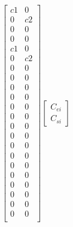 \documentclass[11pt]{article} %
\begin{document}
\begin{align}
\begin{bmatrix}
        c1 & 0\\
        0 & c2\\
        0 & 0\\
        0 & 0\\
        c1 & 0\\
        0 & c2\\
        0 & 0\\
        0 & 0\\
        0 & 0\\
        0 & 0\\
        0 & 0\\
        0 & 0\\
        0 & 0\\
        0 & 0\\
        0 & 0\\
        0 & 0\\
        0 & 0\\
        0 & 0\\
        0 & 0\\
        0 & 0\\
        0 & 0\\
        0 & 0\\
    \end{bmatrix}
    \begin{bmatrix}
        C_{ei}\\
        C_{si}
    \end{bmatrix}
\end{align}
\end{document}
